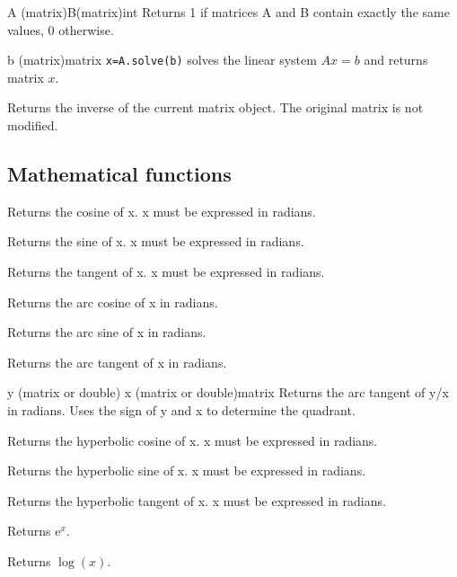 {A (matrix)\newline B(matrix)}{int}
{Returns 1 if matrices A and B contain exactly the same values, 0 otherwise.}

{b (matrix)}{matrix}
{\texttt{x=A.solve(b)} solves the linear system $Ax=b$ and returns matrix $x$.}

{Returns the inverse of the current matrix object. The original matrix is not modified.}

\subsection{Mathematical functions}

{Returns the cosine of x. x must be expressed in radians.}

{Returns the sine of x. x must be expressed in radians.}

{Returns the tangent of x. x must be expressed in radians.}

{Returns the arc cosine of x in radians.}

{Returns the arc sine of x in radians.}

{Returns the arc tangent of x in radians.}

{y (matrix or double)\newline
x (matrix or double)}{matrix}
{Returns the arc tangent of y/x in radians. Uses the sign of y and x to determine the quadrant.}

{Returns the hyperbolic cosine of x. x must be expressed in radians.}

{Returns the hyperbolic sine of x. x must be expressed in radians.}

{Returns the hyperbolic tangent of x. x must be expressed in radians.}

{Returns $\mathrm{e}^x$.}

{Returns $\log(x)$.}

